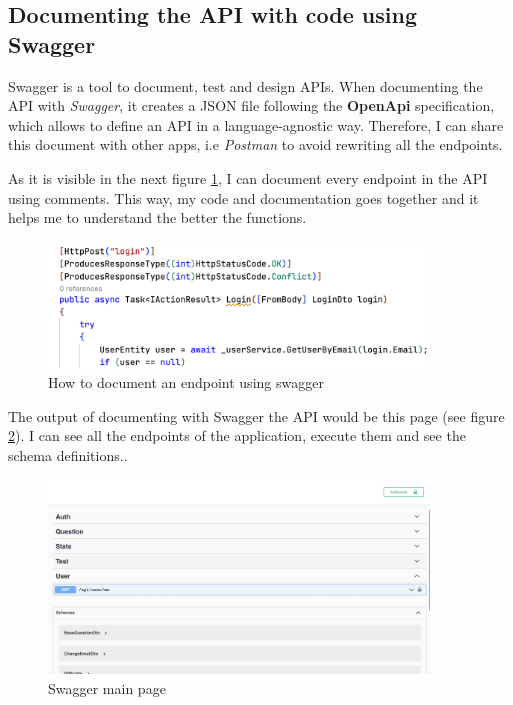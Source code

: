     \subsection{Documenting the API with code using Swagger}
        Swagger \cite{Swagger} is a tool to document, test and design APIs. When documenting the API with \textit{Swagger}, it creates a JSON file following the \textbf{OpenApi} specification, which allows
        to define an API in a language-agnostic way. Therefore, I can share this document with other apps, i.e \textit{Postman} to avoid rewriting all the endpoints.

        As it is visible in the next figure \ref{fig:impl_swagger_endpoint}, I can document every endpoint in the API using comments. This way, my code and documentation goes together and it helps me to understand the better the functions.
        \begin{figure}[H]
            \centering
                \includegraphics[width=0.9\textwidth]{assets/swagger_comment.png}
            \caption{How to document an endpoint using swagger}
            \label{fig:impl_swagger_endpoint}
        \end{figure}

        The output of documenting with Swagger the API would be this page (see figure \ref{fig:impl_swagger}). I can see all the endpoints of the application, execute them and see the schema definitions.. 
        \begin{figure}[H]
            \centering
                \includegraphics[width=0.9\textwidth]{assets/swagger.png}
            \caption{Swagger main page}
            \label{fig:impl_swagger}
        \end{figure}

